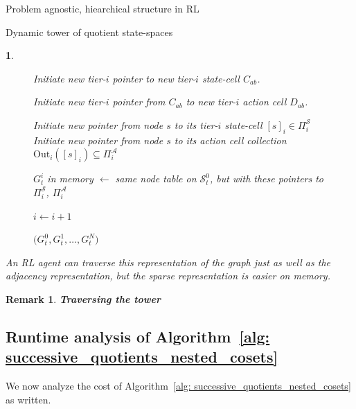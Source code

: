 \documentclass[11pt]{article}
\newtheorem{remark}[subsubsection]{Remark}
\newtheorem{ermark}[subsubsection]{}
\begin{document}
\begin{section}{Problem agnostic, hiearchical structure in RL}
\begin{subsection}{Dynamic tower of quotient state-spaces}
\begin{ermark}
\begin{figure}[!h]
\begin{algorithm}[H]
\begin{algorithmic}[1]

                \State Initiate new tier-$i$ pointer to new tier-$i$ state-cell $C_{ab}$.

                \State Initiate new tier-$i$ pointer from $C_{ab}$ to new tier-$i$ action cell $D_{ab}$.
                \EndFor
            \EndIf
        \EndFor

            \State Initiate new pointer from node $s$  to its tier-$i$ state-cell $[s]_i\in\Pi_i^{\mathcal S}$
            \State Initiate new pointer from node $s$  to its action cell collection $\mathrm{Out}_i([s]_i)\subseteq\Pi_i^{\mathcal A}$
        \EndFor

        \State $G_t^i$ in memory $\gets$ same node table on $\mathcal{S}_t^0$, but with these pointers to $\Pi_i^{\mathcal S}$, $\Pi_i^{\mathcal A}$

        \State $i \gets i+1$

    \EndWhile

    \State \Return $\bigl(
    G_t^0,G_t^1,\dots,G_t^N
    \bigr)$
\EndFunction

\end{algorithmic}
\end{algorithm}
    \label{fig: algorithm 1}
\end{figure}

An RL agent can traverse this representation of the graph just as well as the adjacency representation, but the sparse representation is easier on memory.
\end{ermark}

\begin{remark}
{\bf Traversing the tower}
\normalfont
[..]
\end{remark}

\subsection{Runtime analysis of Algorithm~\ref{alg: successive_quotients_nested_cosets}}

We now analyze the cost of Algorithm~\ref{alg: successive_quotients_nested_cosets} as written.


\end{subsection}
\end{section}
\end{document}
